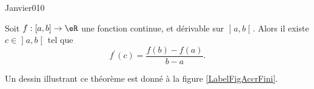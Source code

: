\begin{corrige}{Janvier010}

Soit $f : [a,b] \to \eR$ une fonction continue, et dérivable sur $\mathopen]a,b\mathclose[$.  Alors il existe $c \in \mathopen]a,b\mathclose[$ tel que
\begin{equation}
  f^\prime(c) = \frac{f(b)-f(a)}{b-a}.
\end{equation}

Un dessin illustrant ce théorème est donné à la figure \ref{LabelFigAccrFini}.
\newcommand{\CaptionFigAccrFini}{Illustration du théorème des acroissements finis.}


\end{corrige}
